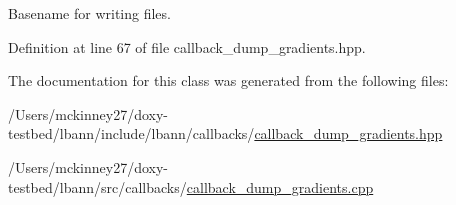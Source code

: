 Basename for writing files. 

Definition at line 67 of file callback\+\_\+dump\+\_\+gradients.\+hpp.



The documentation for this class was generated from the following files\+:\begin{DoxyCompactItemize}
\item 
/\+Users/mckinney27/doxy-\/testbed/lbann/include/lbann/callbacks/\hyperlink{callback__dump__gradients_8hpp}{callback\+\_\+dump\+\_\+gradients.\+hpp}\item 
/\+Users/mckinney27/doxy-\/testbed/lbann/src/callbacks/\hyperlink{callback__dump__gradients_8cpp}{callback\+\_\+dump\+\_\+gradients.\+cpp}\end{DoxyCompactItemize}
